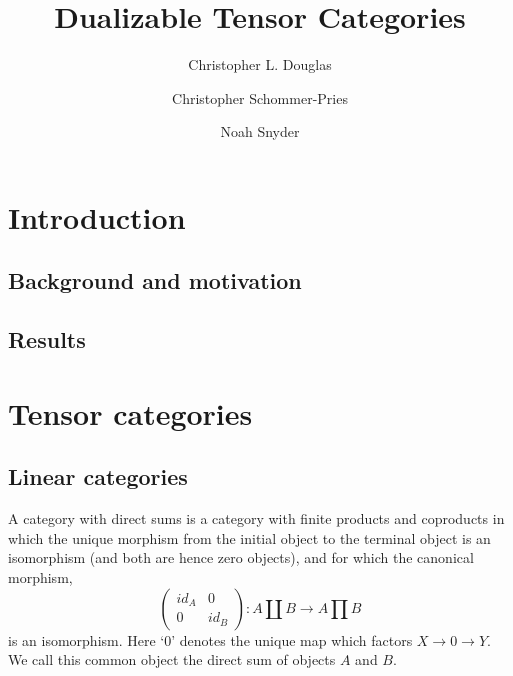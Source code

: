 \documentclass{amsart}
\begin{document}
\title{Dualizable Tensor Categories}

\begin{abstract}

\end{abstract}
	
\author{Christopher L. Douglas}
\address{Department of Mathematics, University of California, Berkeley, CA 94720, USA}
	
\author{Christopher Schommer-Pries}
\address{Department of Mathematics \\
	Harvard University\\
	1 Oxford St.\\
	Cambridge, MA 02138} %

\author{Noah Snyder}
\address{}
\email{}

\maketitle	
\tableofcontents

\section{Introduction}

\subsection{Background and motivation}

\subsection{Results}

\section{Tensor categories}




\subsection{Linear categories}

A category with direct sums is a category with finite products and coproducts in which the unique morphism from the initial object to the terminal object is an isomorphism (and both are hence zero objects), and for which the canonical morphism,
\begin{equation*}
	\left( \begin{array}{cc} id_A & 0 \\ 0 & id_B \end{array}\right) : A \coprod B \to A \prod B
\end{equation*}
is an isomorphism.  Here `0' denotes the unique map which factors $X \to 0 \to Y$. We call this common object the direct sum of objects $A$ and $B$.
\end{document}
